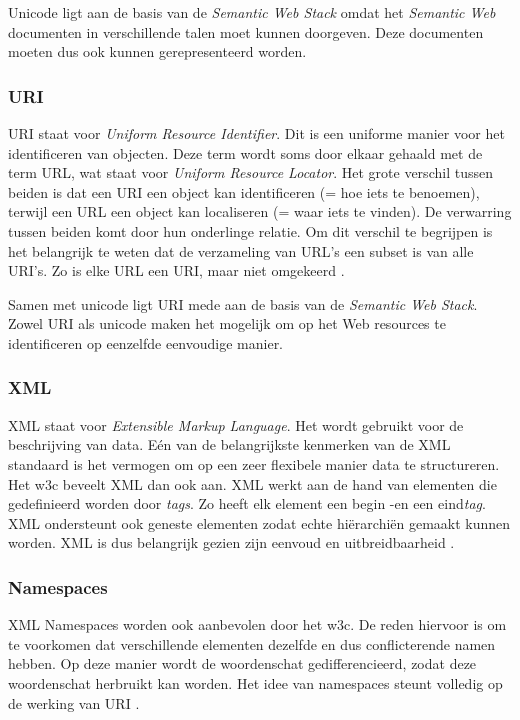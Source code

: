 Unicode ligt aan de basis van de \textit{Semantic Web Stack} omdat het \textit{Semantic Web} documenten in verschillende talen moet kunnen doorgeven. Deze documenten moeten dus ook kunnen gerepresenteerd worden.

\subsubsection{URI}
URI staat voor \textit{Uniform Resource Identifier}. Dit is een uniforme manier voor het identificeren van objecten. Deze term wordt soms door elkaar gehaald met de term URL, wat staat voor \textit{Uniform Resource Locator}. Het grote verschil tussen beiden is dat een URI een object kan identificeren (= hoe iets te benoemen), terwijl een URL een object kan localiseren (= waar iets te vinden). De verwarring tussen beiden komt door hun onderlinge relatie. Om dit verschil te begrijpen is het belangrijk te weten dat de verzameling van URL's een subset is van alle URI's. Zo is elke URL een URI, maar niet omgekeerd \cite{uri}.

Samen met unicode ligt URI mede aan de basis van de \textit{Semantic Web Stack}. Zowel URI als unicode maken het mogelijk om op het Web resources te identificeren op eenzelfde eenvoudige manier.

\subsubsection{XML}
XML staat voor \textit{Extensible Markup Language}. Het wordt gebruikt voor de beschrijving van data. Eén van de belangrijkste kenmerken van de XML standaard is het vermogen om op een zeer flexibele manier data te structureren. Het \acrfull{w3c} beveelt XML dan ook aan. XML werkt aan de hand van elementen die gedefinieerd worden door \textit{tags}. Zo heeft elk element een begin -en een eind\textit{tag}. XML ondersteunt ook geneste elementen zodat echte hiërarchiën gemaakt kunnen worden. XML is dus belangrijk gezien zijn eenvoud en uitbreidbaarheid \cite{bray2000extensible}. 

\subsubsection{Namespaces}
XML Namespaces worden ook aanbevolen door het \acrshort{w3c}. De reden hiervoor is om te voorkomen dat verschillende elementen dezelfde en dus conflicterende namen hebben. Op deze manier wordt de woordenschat gedifferencieerd, zodat deze woordenschat herbruikt kan worden. Het idee van namespaces steunt volledig op de werking van URI \cite{bray1999namespaces}.

